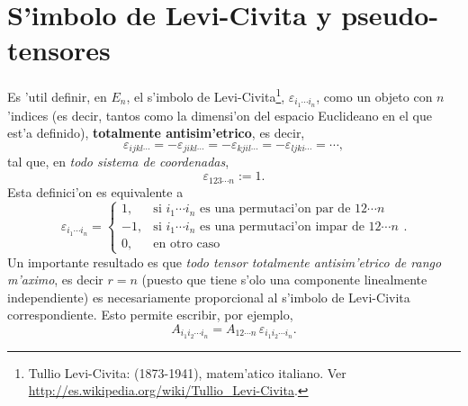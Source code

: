 \section{S'imbolo de Levi-Civita y pseudo-tensores}
Es 'util definir, en $E_n$, el s'imbolo de Levi-Civita\footnote{Tullio Levi-Civita:  (1873-1941), matem'atico italiano. Ver \url{http://es.wikipedia.org/wiki/Tullio_Levi-Civita}.}, $\varepsilon_{i_1\cdots i_n}$, como un objeto con $n$ 'indices (es decir, tantos como la dimensi'on del espacio Euclideano en el que est'a definido), \textbf{totalmente antisim'etrico}, es decir,
\begin{equation}
\varepsilon_{ijkl\cdots}=-\varepsilon_{jikl\cdots}=-\varepsilon_{kjil\cdots} =-\varepsilon_{ljki\cdots}= \cdots,
\end{equation}
tal que, en \textit{todo sistema de coordenadas},
\begin{equation}
\varepsilon_{123\cdots n}:=1.
\end{equation}
Esta definici'on es equivalente a
\begin{equation}
\varepsilon_{i_1\cdots i_n}
=\left\lbrace\begin{array}{rl}
1, & \text{si $i_1\cdots i_n$ es una permutaci'on par de $12\cdots n$} \\ 
-1, & \text{si $i_1\cdots i_n$ es una permutaci'on impar de $12\cdots n$} \\ 
0, & \text{en otro caso} 
\end{array} \right. .
\end{equation}
Un importante resultado es que \textit{todo tensor totalmente antisim'etrico de rango m'aximo}, es decir $r=n$ (puesto que tiene s'olo una componente linealmente independiente) es necesariamente proporcional al s'imbolo de Levi-Civita correspondiente. Esto permite escribir, por ejemplo,
\begin{equation}\label{Aep}
A_{i_1i_2\cdots i_n}=A_{12\cdots n}\,\varepsilon_{i_1i_2\cdots i_n}.
\end{equation}

